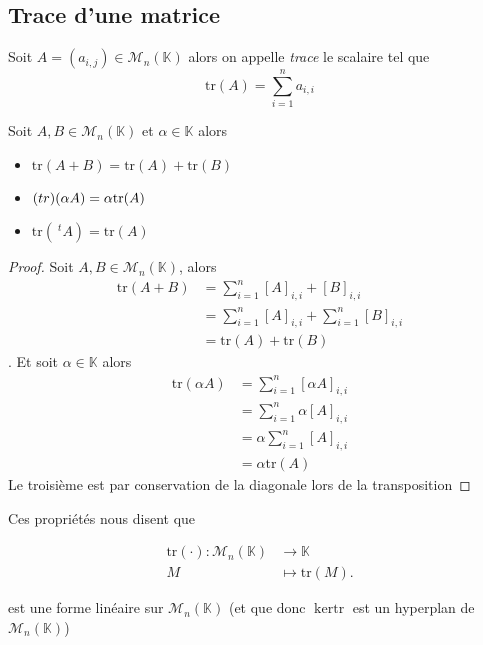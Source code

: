 \documentclass[11pt,colorlinks]{book}
\theoremstyle{mytheoremstyle}
\theoremstyle{mytheoremstyle}
\theoremstyle{mytheoremstyle}
\theoremstyle{mytheoremstyle}
\theoremstyle{mytheoremstyle}
\theoremstyle{mytheoremstyle}
\theoremstyle{mytheoremstyle}
\theoremstyle{mytheoremstyle}
\theoremstyle{myproblemstyle}
\def\mbb#1{\mathbb{#1}}
\def\bK{\mbb{K}}
\newcommand{\vfunc}[5]{
  \begin{align*}
    #1 \colon #2 &\to #3\\
    #4 &\mapsto #5.
  \end{align*}
}
\begin{document}
\subsection{Trace d'une matrice}
\begin{definition}
  Soit $A = (a_{i,j}) \in \mathcal{M}_n(\bK)$ alors on appelle \textit{trace} le scalaire tel que 
  \begin{equation*}
    \text{tr}(A) = \sum_{i=1}^n a_{i,i}
  \end{equation*}
\end{definition}
\begin{prop}[Propriétés]
  Soit $A,B \in \mathcal{M}_n(\bK)$ et $\alpha \in \bK$ alors 
  \begin{itemize}
    \item $\text{tr}(A+B) = \text{tr}(A) + \text{tr}(B)$ 
    \item $\text(tr)(\alpha A) = \alpha \text{tr}(A)$
    \item $\text{tr}(~^t A) = \text{tr}(A)$
  \end{itemize}
  \begin{proof}
    Soit $A,B \in \mathcal{M}_n(\bK)$, alors 
    \begin{align*}
      \text{tr}(A+B) &= \sum_{i=1}^n [A]_{i,i} + [B]_{i,i} \\ 
      &= \sum_{i=1}^n [A]_{i,i} + \sum_{i=1}^n [B]_{i,i} \\ 
      &= \text{tr}(A) + \text{tr}(B)
    \end{align*}.
    Et soit $\alpha \in \bK$ alors 
    \begin{align*}
      \text{tr}(\alpha A) &= \sum_{i=1}^n [\alpha A]_{i,i} \\ 
      &= \sum_{i=1}^n \alpha [A]_{i,i} \\ 
      &= \alpha \sum_{i=1}^n [A]_{i,i} \\ 
      &= \alpha \text{tr}(A)
    \end{align*}
    Le troisième est par conservation de la diagonale lors de la transposition
  \end{proof}
\end{prop}
\begin{rmq}
  Ces propriétés nous disent que 
  \vfunc{\text{tr}(\cdot)}{\mathcal{M}_n(\bK)}{\bK}{M}{\text{tr}(M)}
  est une forme linéaire sur $\mathcal{M}_n(\bK)$ (et que donc $\ker \text{tr}$ est un hyperplan de $\mathcal{M}_n(\bK)$)
\end{rmq}
\end{document}

